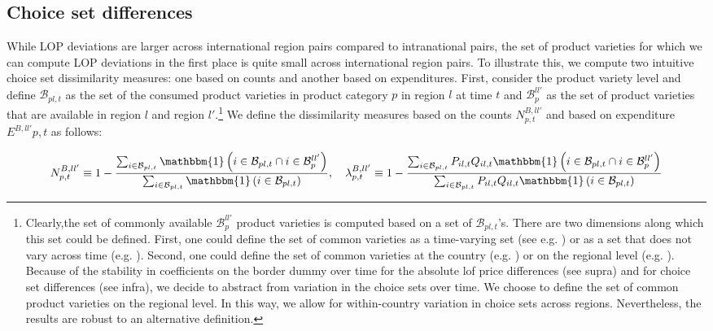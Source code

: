 \subsection{Choice set differences}
While LOP deviations are larger across international region pairs compared to intranational pairs, the set of product varieties for which we can compute LOP deviations in the first place is quite small across international region pairs. To illustrate this, we compute two intuitive choice set dissimilarity measures: one based on counts and another based on expenditures. First, consider the product variety level and define $\mathcal{B}_{pl,t}$ as the set of the consumed product varieties in product category $p$ in region $l$ at time $t$ and $\mathcal{B}^{ll'}_{p}$ as the set of product varieties that are available in region $l$ and region $l'$.\footnote{Clearly,the set of commonly available $\mathcal{B}^{ll'}_{p}$ product varieties is computed based on a set of $\mathcal{B}_{pl,t}$'s. There are two dimensions along which this set could be defined. First, one could define the set of common varieties as a time-varying set (see e.g. \citet{Broda2010, Redding2020}) or as a set that does not vary across time (e.g. \citet{Argente2021}). Second, one could define the set of common varieties at the country (e.g. \citet{Broda2010, Redding2020}) or on the regional level (e.g. \citet{Handbury2015, Feenstra2020}). Because of the stability in coefficients on the border dummy over time for the absolute lof price differences (see supra) and for choice set differences (see infra), we decide to abstract from variation in the choice sets over time. We choose to define the set of common product varieties on the regional level. In this way, we allow for within-country variation in choice sets across regions. Nevertheless, the results are robust to an alternative definition.} We define the dissimilarity measures based on the counts $N^{B,ll'}_{p,t}$ and based on expenditure $E^{B,ll'}{p,t}$ as follows: 
\begin{linenomath*}
\begin{equation*}
    N^{B,ll'}_{p,t} \equiv 
        1 - \frac{\sum_{i \in \mathcal{B}_{pl,t}} 
                    \mathbbm{1}\left(i \in \mathcal{B}_{pl,t} 
                                        \cap i \in \mathcal{B}^{ll'}_p\right)}
                 {\sum_{i \in \mathcal{B}_{pl,t}} 
                    \mathbbm{1}\left(i \in \mathcal{B}_{pl,t}\right)}, \quad 
    \lambda^{B,ll'}_{p,t} \equiv 
        1 - \frac{\sum_{i \in \mathcal{B}_{pl,t}}P_{il,t}Q_{il,t} 
                    \mathbbm{1}\left(i \in \mathcal{B}_{pl,t} 
                                        \cap i \in \mathcal{B}^{ll'}_p\right)}
                 {\sum_{i \in \mathcal{B}_{pl,t}}P_{il,t}Q_{il,t} 
                    \mathbbm{1}\left(i \in \mathcal{B}_{pl,t}\right)}
\end{equation*}
\end{linenomath*}
